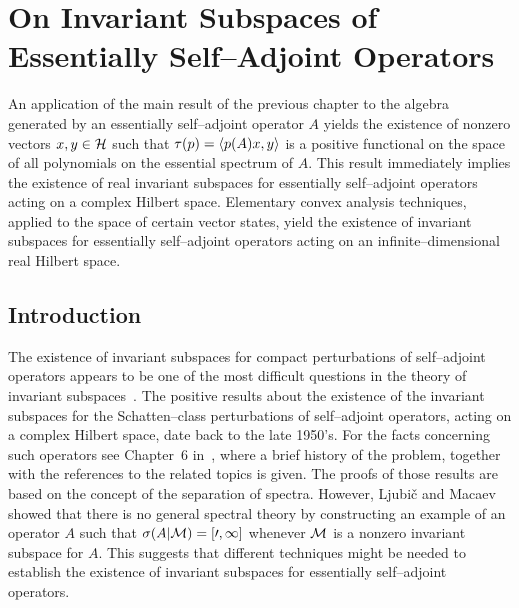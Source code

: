 \def\baselinestretch{1}

\chapter{On Invariant Subspaces of Essentially Self--Adjoint Operators}

\def\baselinestretch{1.66}


An application of the main result of the previous chapter to
the algebra generated by an essentially self--adjoint operator
$A$ yields the existence of nonzero vectors $x,y\in{\cal H}$ such
that $\tau(p)=\left<p(A)x,y\right>$ is a positive functional on the
space of all polynomials on the essential spectrum of $A$. This
result immediately implies the existence of real invariant
subspaces for essentially self--adjoint operators acting on a
complex Hilbert space. Elementary convex analysis techniques,
applied to the space of certain vector states, yield the
existence of invariant subspaces for essentially self--adjoint
operators acting on an infinite--dimensional real Hilbert
space.

\goodbreak
\section{Introduction}

The existence of invariant subspaces for compact perturbations
of self--adjoint operators appears to be one of the most
difficult questions in the theory of invariant
subspaces~\cite{Lom92}. The positive results about the
existence of the invariant subspaces for the Schatten--class
perturbations of self--adjoint operators, acting on a complex
Hilbert space, date back to the late 1950's. For the facts
concerning such operators see Chapter~6 in~\cite{RR73}, where a
brief history of the problem, together with the references to
the related topics is given. The proofs of those results are
based on the concept of the separation of spectra. However,
Ljubi\v{c} and Macaev~\cite{LM65} showed that there is no
general spectral theory by constructing an example of an
operator $A$ such that $\sigma(A|\cal{M})=[0,1]$ whenever
$\cal{M}$ is a nonzero invariant subspace for $A$. This
suggests that different techniques might be needed to establish
the existence of invariant subspaces for essentially
self--adjoint operators.

